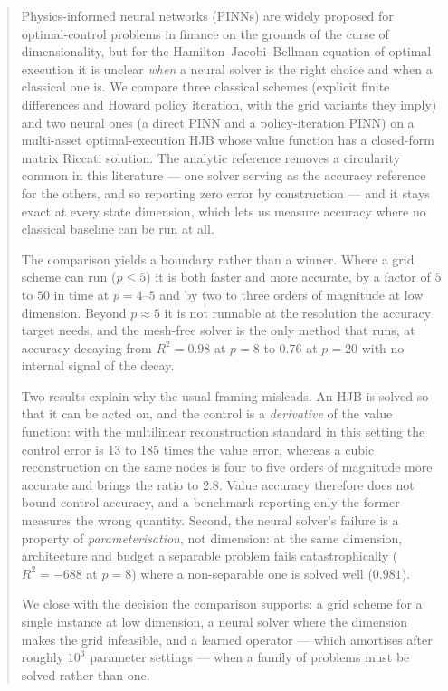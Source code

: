 \documentclass[conference]{IEEEtran}
\begin{document}
\begin{abstract}
Physics-informed neural networks (PINNs) are widely proposed for optimal-control problems in
finance on the grounds of the curse of dimensionality, but for the
Hamilton--Jacobi--Bellman equation of optimal execution it is unclear \emph{when} a neural solver
is the right choice and when a classical one is. We compare three classical schemes (explicit
finite differences and Howard policy iteration, with the grid variants they imply) and two neural
ones (a direct PINN and a policy-iteration PINN) on a multi-asset optimal-execution HJB whose value
function has a closed-form matrix Riccati solution. The analytic reference removes a circularity
common in this literature --- one solver serving as the accuracy reference for the others, and so
reporting zero error by construction --- and it stays exact at every state dimension, which lets us
measure accuracy where no classical baseline can be run at all.

The comparison yields a boundary rather than a winner. Where a grid scheme can run ($p \le 5$) it
is both faster and more accurate, by a factor of $5$ to $50$ in time at $p=4$--$5$ and by two to
three orders of magnitude at low dimension. Beyond $p \approx 5$ it is not runnable at the
resolution the accuracy target needs, and the mesh-free solver is the only method that runs, at
accuracy decaying from $R^2 = 0.98$ at $p=8$ to $0.76$ at $p=20$ with no internal signal of the
decay.

Two results explain why the usual framing misleads. An HJB is solved so that it can be acted on,
and the control is a \emph{derivative} of the value function: with the multilinear reconstruction
standard in this setting the control error is 13 to 185 times the value error, whereas a cubic
reconstruction on the same nodes is four to five orders of magnitude more accurate and brings the
ratio to 2.8. Value accuracy therefore does not bound control accuracy, and a benchmark reporting
only the former measures the wrong quantity. Second, the neural solver's failure is a property of
\emph{parameterisation}, not dimension: at the same dimension, architecture and budget a separable
problem fails catastrophically ($R^2 = -688$ at $p=8$) where a non-separable one is solved well
($0.981$).

We close with the decision the comparison supports: a grid scheme for a single instance at low
dimension, a neural solver where the dimension makes the grid infeasible, and a learned operator
--- which amortises after roughly $10^3$ parameter settings --- when a family of problems must be
solved rather than one.
\end{abstract}
\end{document}
